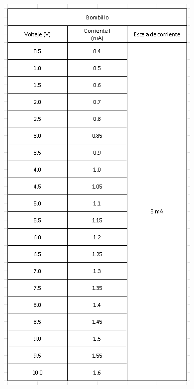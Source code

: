 \documentclass[10pt]{article}
\begin{document}
\begin{multicols}{2}
\begin{figure}[H]
		\includegraphics[width = 0.78\linewidth]{./Images/Table2.png}
	\end{figure}






\end{multicols}
\end{document}
